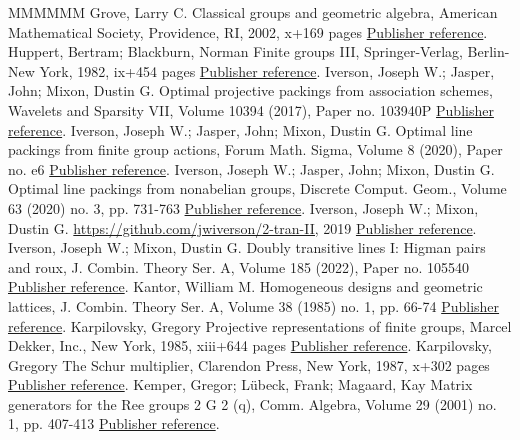 \begin{thebibliography}{MMMMMM}
 Grove, Larry C. Classical groups and geometric algebra, American Mathematical Society, Providence, RI, 2002, x+169 pages \href{https://alco.centre-mersenne.org/articles/10.5802/alco.324/#Grove:02}{Publisher reference}.
 Huppert, Bertram; Blackburn, Norman Finite groups III, Springer-Verlag, Berlin-New York, 1982, ix+454 pages \href{https://alco.centre-mersenne.org/articles/10.5802/alco.324/#HuppertB:82:III}{Publisher reference}.
 Iverson, Joseph W.; Jasper, John; Mixon, Dustin G. Optimal projective packings from association schemes, Wavelets and Sparsity VII, Volume 10394 (2017), Paper no. 103940P \href{https://alco.centre-mersenne.org/articles/10.5802/alco.324/#IversonJM:SPIE:17}{Publisher reference}.
 Iverson, Joseph W.; Jasper, John; Mixon, Dustin G. Optimal line packings from finite group actions, Forum Math. Sigma, Volume 8 (2020), Paper no. e6 \href{https://alco.centre-mersenne.org/articles/10.5802/alco.324/#IversonJM:17}{Publisher reference}.
 Iverson, Joseph W.; Jasper, John; Mixon, Dustin G. Optimal line packings from nonabelian groups, Discrete Comput. Geom., Volume 63 (2020) no. 3, pp. 731-763 \href{https://alco.centre-mersenne.org/articles/10.5802/alco.324/#IversonJM:19}{Publisher reference}.
 Iverson, Joseph W.; Mixon, Dustin G. \url{https://github.com/jwiverson/2-tran-II,} 2019 \href{https://alco.centre-mersenne.org/articles/10.5802/alco.324/#github}{Publisher reference}.
 Iverson, Joseph W.; Mixon, Dustin G. Doubly transitive lines I: Higman pairs and roux, J. Combin. Theory Ser. A, Volume 185 (2022), Paper no. 105540 \href{https://alco.centre-mersenne.org/articles/10.5802/alco.324/#IversonM:18}{Publisher reference}.
 Kantor, William M. Homogeneous designs and geometric lattices, J. Combin. Theory Ser. A, Volume 38 (1985) no. 1, pp. 66-74 \href{https://alco.centre-mersenne.org/articles/10.5802/alco.324/#Kantor:85}{Publisher reference}.
 Karpilovsky, Gregory Projective representations of finite groups, Marcel Dekker, Inc., New York, 1985, xiii+644 pages \href{https://alco.centre-mersenne.org/articles/10.5802/alco.324/#Karpilovsky:85}{Publisher reference}.
 Karpilovsky, Gregory The Schur multiplier, Clarendon Press, New York, 1987, x+302 pages \href{https://alco.centre-mersenne.org/articles/10.5802/alco.324/#Karpilovsky:87}{Publisher reference}.
 Kemper, Gregor; Lübeck, Frank; Magaard, Kay Matrix generators for the Ree groups  2 G 2 (q), Comm. Algebra, Volume 29 (2001) no. 1, pp. 407-413 \href{https://alco.centre-mersenne.org/articles/10.5802/alco.324/#KemperLM:01}{Publisher reference}.

\end{thebibliography}
